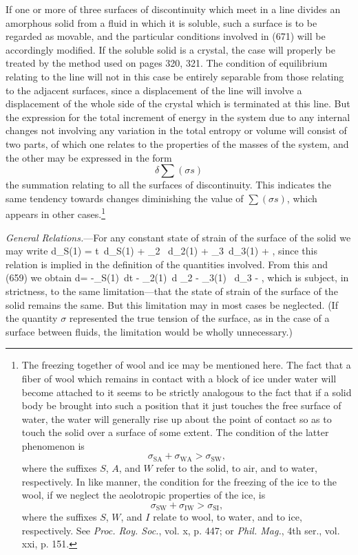 \documentclass[12pt]{memoir}
\newcommand{\dd}{\delta}
\begin{document}
If one or more of three surfaces of discontinuity which meet in a line divides an amorphous solid from a fluid in which it is soluble, such a surface is to be regarded as movable, and the particular conditions involved in (671) will be accordingly modified. If the soluble solid is a crystal, the case will properly be treated by the method used on pages 320, 321. The condition of equilibrium relating to the line will not in this case be entirely separable from those relating to the adjacent surfaces, since a displacement of the line will involve a displacement of the whole side of the crystal which is terminated at this line. But the expression for the total increment of energy in the system  due to any internal changes not involving any variation in the total entropy or volume will consist of two parts, of which one relates to the properties of the masses of the system, and the other may be expressed in the form
$$ \dd \sum(\sigma s)$$
the summation relating to all the surfaces of discontinuity. This indicates the same tendency towards changes diminishing the value of $\sum(\sigma s)$, which appears in other cases.\footnote{The freezing together of wool and ice may be mentioned here. The fact that a fiber of wool which remains in contact with a block of ice under water will become attached to it seems to be strictly analogous to the fact that if a solid body be brought into such a position that it just touches the free surface of water, the water will generally rise up about the point of contact so as to touch the solid over a surface of some extent. The condition of the latter phenomenon is
$$ \sigma_{\text{SA}} + \sigma_{\text{WA}} > \sigma_{\text{SW}} ,$$
where the suffixes $S$, $A$, and $W$ refer to the solid, to air, and to water, respectively. In like manner, the condition for the freezing of the ice to the wool, if we neglect the aeolotropic properties of the ice, is
$$ \sigma_{\text{SW}} + \sigma_{\text{IW}} > \sigma_{\text{SI}},$$
where the suffixes $S$, $W$, and $I$ relate to wool, to water, and to ice, respectively. See \textit{Proc. Roy. Soc.}, vol. x, p. 447; or \textit{Phil. Mag.}, 4th ser., vol. xxi, p. 151.}

\textit{General Relations.}---For any constant state of strain of the surface of the solid we may write
\eqs d\epsilon_{S(1)} = t\, d\eta_{S(1)} + \mu_2 \, d\Gamma_{2(1)} + \mu_3\, d\Gamma_{3(1)} + , \label{674} \eqe
since this relation is implied in the definition of the quantities involved. From this and (659) we obtain
\eqs d\sigma = -\eta_{S(1)}\, dt - \Gamma_{2(1)}\, d \mu_2 - \Gamma_{3(1)} \, d\mu_3 - ,  \label{675} \eqe
which is subject, in strictness, to the same limitation---that the state of strain of the surface of the solid remains the same. But this limitation may in most cases be neglected. (If the quantity $\sigma$ represented the true tension of the surface, as in the case of a surface between fluids, the limitation would be wholly unnecessary.)
\end{document}
